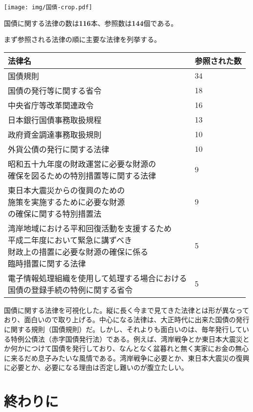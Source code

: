 \documentclass[a5j,openany,twoside]{jsbook}
\begin{document}
\texttt{[image: img/国債-crop.pdf]}

国債に関する法律の数は\textbf{116}本、参照数は\textbf{144}個である。

まず参照される法律の順に主要な法律を列挙する。

\begin{table}[htb]
  \begin{tabular}{|l|l|}  \hline
法律名 & 参照された数 \\ \hline \hline
国債規則 & 34 \\
国債の発行等に関する省令 & 18 \\
中央省庁等改革関連政令 & 16 \\
日本銀行国債事務取扱規程 & 13 \\
政府資金調達事務取扱規則 & 10 \\
外貨公債の発行に関する法律 & 10 \\
\shortstack{昭和五十九年度の財政運営に必要な財源の\\確保を図るための特別措置等に関する法律} & 9 \\
\shortstack{東日本大震災からの復興のための\\施策を実施するために必要な財源\\の確保に関する特別措置法} & 9 \\
\shortstack{湾岸地域における平和回復活動を支援するため\\平成二年度において緊急に講ずべき\\財政上の措置に必要な財源の確保に係る\\臨時措置に関する法律} & 5 \\
\shortstack{電子情報処理組織を使用して処理する場合における\\国債の登録手続の特例に関する省令} & 5  \\ \hline
  \end{tabular}
\end{table}

国債に関する法律を可視化した。縦に長く今まで見てきた法律とは形が異なっており、面白いので取り上げる。中心になる法律は、大正時代に出来た国債の発行に関する規則（国債規則）だ。しかし、それよりも面白いのは、毎年発行している特例公債法（赤字国債発行法）である。例えば、湾岸戦争とか東日本大震災とか何かにつけて国債を発行しており、なんとなく盆暮れと無く実家にお金の無心に来るだめ息子みたいな風情である。湾岸戦争に必要とか、東日本大震災の復興に必要とか、必要になる理由は否定し難いのが腹立たしい。

\chapter{終わりに}
\end{document}
